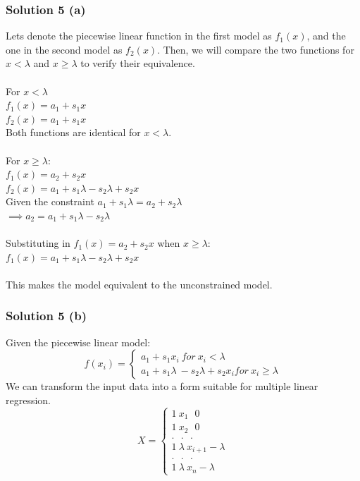 \documentclass{assignment}
\begin{document}
\begin{problem}
\subsubsection*{Solution 5 (a)}
Lets denote the piecewise linear function in the first model as $f_1(x)$, and the one in the second model as $f_2(x)$. Then, we will compare the two functions for $x<\lambda$ and $x \geq \lambda$ to verify their equivalence.
\\
\\
For $x<\lambda$\\
$f_1(x) = a_1 + s_1x$\\
$f_2(x) = a_1 + s_1x$\\
Both functions are identical for $x<\lambda$. \\ \\
For $x\geq \lambda:$\\
$f_1(x) = a_2+s_2x$\\
$f_2(x) = a_1 + s_1\lambda - s_2\lambda + s_2x$ \\
Given the constraint $a_1 + s_1\lambda = a_2 + s_2\lambda$\\
$\implies a_2 = a_1 + s_1\lambda - s_2\lambda$\\ \\
Substituting in $f_1(x) = a_2+s_2x$ when $x\geq \lambda$:\\
$f_1(x) = a_1+s_1\lambda - s_2\lambda + s_2x$\\ \\
This makes the model equivalent to the unconstrained model.
 
\subsubsection*{Solution 5 (b)}
Given the piecewise linear model:
\begin{equation}
    f(x_i) = \begin{cases}
        a_1 + s_1x_i\ for\ x_i<\lambda \\
        a_1 + s_1\lambda\ - s_2\lambda + s_2x_i for\ x_i\geq \lambda
    \end{cases}
\end{equation}
We can transform the input data into a form suitable for multiple linear regression. 
\\

\begin{equation}
    X =  \begin{cases}
        1\  x_1\ \ \ 0 \\
        1\  x_2\ \ \ 0 \\
        .\ \ \ .\ \ \ . \\
        1\ \lambda\ x_{i+1} - \lambda\\
        .\ \ \ .\ \ \ .\\
        1\ \lambda\ x_n-\lambda
    \end{cases} 
\end{equation}

\end{problem}
\end{document}
